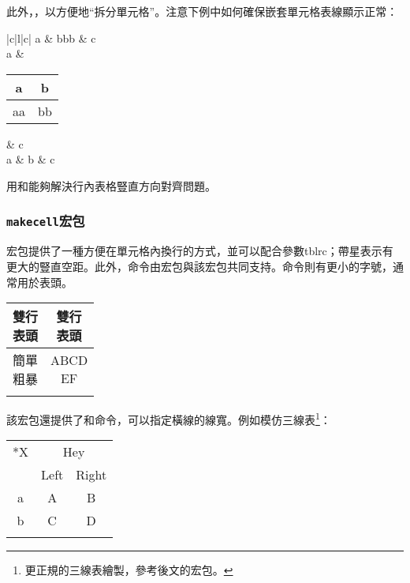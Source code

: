 此外，，以方便地“拆分單元格”。注意下例中如何確保嵌套單元格表線顯示正常：

\begin{codeshow}
\begin{tabular}{|c|l|c|}
\hline
a & bbb & c \\ \hline
a & 
{\begin{tabular}{c|c}
a & b \\ \hline
aa & bb \\
\end{tabular}}
& c \\ \hline
a & b & c \\ \hline
\end{tabular}
\end{codeshow}

用和能夠解決行內表格豎直方向對齊問題。

\subsubsection{\texttt{makecell}宏包}
宏包提供了一種方便在單元格內換行的方式，並可以配合參數tblrc；帶星表示有更大的豎直空距。此外，命令由宏包與該宏包共同支持。命令則有更小的字號，通常用於表頭。
\begin{codeshow}
\begin{tabular}{|c|c|}
\hline
\thead{雙行\\表頭} & \thead{雙行\\表頭}\\
\hline
\multirowcell{2}{簡單\\粗暴} & \makecell[l]{ABCD\\EF} \\
\cline{2-2} & \makecell*{更大的豎直空距} \\
\hline
\end{tabular}
\end{codeshow}

該宏包還提供了和命令，可以指定橫線的線寬。例如模仿三線表\footnote{更正規的三線表繪製，參考後文的宏包。}：
\begin{codeshow}
\begin{tabular}{ccc}
\Xhline{2pt}
\multirow{2}*{X} & 
\multicolumn{2}{c}{Hey}\\
\Xcline{2-3}{0.4pt}
& Left & Right \\
\Xhline{1pt} 
a & A & B \\
b & C & D \\
\Xhline{2pt}
\end{tabular}
\end{codeshow}

